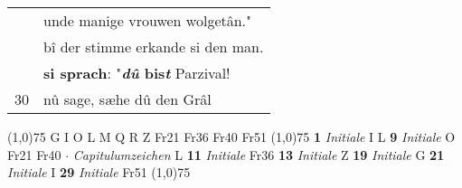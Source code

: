 \documentclass[8pt,a4paper,notitlepage]{article}
\begin{document}
\begin{table}[ht]
\begin{minipage}[t]{0.5\linewidth}
\begin{tabular}{rl}
 & unde manige vrouwen wolgetân."\\ 
 & bî der stimme erkande si den man.\\ 
 & \textbf{si sprach}: "\textbf{\textit{dû} bis\textit{t}} Parzival!\\ 
30 & nû sage, sæhe dû den Grâl\\ 
\end{tabular}
\scriptsize
\line(1,0){75} \newline
G I O L M Q R Z Fr21 Fr36 Fr40 Fr51 \newline
\line(1,0){75} \newline
\textbf{1} \textit{Initiale} I L  \textbf{9} \textit{Initiale} O Fr21 Fr40   $\cdot$ \textit{Capitulumzeichen} L  \textbf{11} \textit{Initiale} Fr36  \textbf{13} \textit{Initiale} Z  \textbf{19} \textit{Initiale} G  \textbf{21} \textit{Initiale} I  \textbf{29} \textit{Initiale} Fr51  \newline
\line(1,0){75} \newline

\end{minipage}
\end{table}
\end{document}
